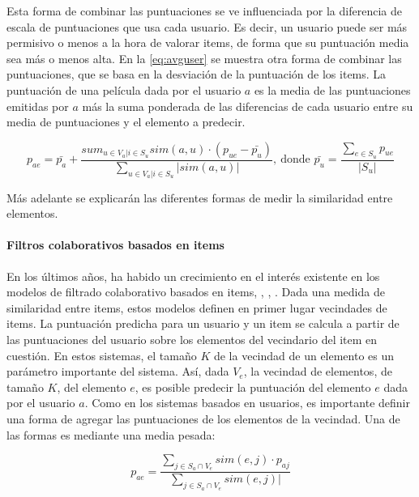 Esta forma de combinar las puntuaciones se ve influenciada por la diferencia de escala de puntuaciones que usa cada usuario. Es decir, un usuario puede ser más permisivo o menos a la hora de valorar items, de forma que su puntuación media sea más o menos alta. En la \autoref{eq:avguser} se muestra otra forma de combinar las puntuaciones, que se basa en la desviación de la puntuación de los items. La puntuación de una película dada por el usuario $a$ es la media de las puntuaciones emitidas por $a$ más la suma ponderada de las diferencias de cada usuario entre su media de puntuaciones y el elemento a predecir.

\begin{equation}
    p_{ae} = \bar{p_a} + \frac{sum_{u\in V_a | i \in S_u}{sim\left(a, u\right)\cdot \left(p_{ue}-\bar{p_u}\right)}}{\sum_{u\in V_a | i \in S_u}{|sim\left(a, u\right)|}},\ \text{donde } \bar{p_u} = \frac{\sum_{e\in S_u}{p_{ue}}}{|S_u|}
    \label{eq:avguser}
\end{equation}


Más adelante se explicarán las diferentes formas de medir la similaridad entre elementos.

\paragraph{Filtros colaborativos basados en items}

En los últimos años, ha habido un crecimiento en el interés existente en los modelos de filtrado colaborativo basados en items, \cite{Amazon}, \cite{sarwar}, \cite{karypis}. Dada una medida de similaridad entre items, estos modelos definen en primer lugar vecindades de items. La puntuación predicha para un usuario y un item se calcula a partir de las puntuaciones del usuario sobre los elementos del vecindario del item en cuestión. En estos sistemas, el tamaño $K$ de la vecindad de un elemento es un parámetro importante del sistema. Así, dada $V_e$, la vecindad de elementos, de tamaño $K$, del elemento $e$, es posible predecir la puntuación del elemento $e$ dada por el usuario $a$. Como en los sistemas basados en usuarios, es importante definir una forma de agregar las puntuaciones de los elementos de la vecindad. Una de las formas es mediante una media pesada:

\begin{equation}
    p_{ae} = \frac{\sum_{j \in S_a \cap V_e}{sim\left(e, j\right) \cdot p_{aj}}}{\sum_{j \in S_a \cap V_e}{sim\left(e, j\right)|}}
    \label{eq:itembased}
\end{equation}

